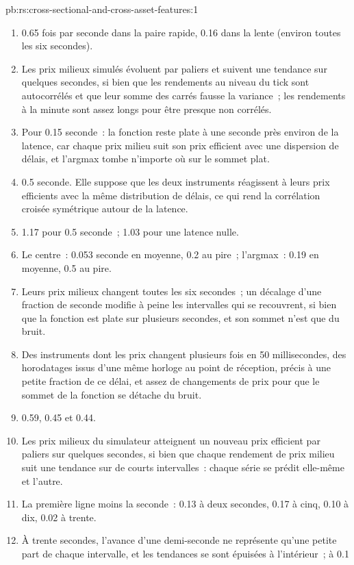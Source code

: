 \begin{solution}{pb:rs:cross-sectional-and-cross-asset-features:1}
\begin{enumerate}
\item 0.65 fois par seconde dans la paire rapide, 0.16 dans la lente (environ toutes les six secondes).
\item Les prix milieux simulés évoluent par paliers et suivent une tendance sur quelques secondes, si bien que les rendements au niveau du tick sont autocorrélés et que leur somme des carrés
fausse la variance~; les rendements à la minute sont assez longs pour être presque non corrélés.
\item Pour 0.15 seconde~: la fonction reste plate à une seconde près environ de la latence, car chaque prix milieu suit son prix efficient avec une
dispersion de délais, et l'argmax tombe n'importe où sur le sommet plat.
\item 0.5 seconde. Elle suppose que les deux instruments réagissent à leurs prix efficients avec la même distribution de délais, ce qui rend la
corrélation croisée symétrique autour de la latence.
\item 1.17 pour 0.5 seconde~; 1.03 pour une latence nulle.
\item Le centre~: 0.053 seconde en moyenne, 0.2 au pire~; l'argmax~: 0.19 en moyenne, 0.5 au pire.
\item Leurs prix milieux changent toutes les six secondes~; un décalage d'une fraction de seconde modifie à peine les intervalles qui se recouvrent, si bien que la fonction est
plate sur plusieurs secondes, et son sommet n'est que du bruit.
\item Des instruments dont les prix changent plusieurs fois en 50 millisecondes, des horodatages issus d'une même horloge au point de réception, précis à une
petite fraction de ce délai, et assez de changements de prix pour que le sommet de la fonction se détache du bruit.
\item 0.59, 0.45 et 0.44.
\item Les prix milieux du simulateur atteignent un nouveau prix efficient par paliers sur quelques secondes, si bien que chaque rendement de prix milieu suit une tendance sur de courts intervalles~:
chaque série se prédit elle-même et l'autre.
\item La première ligne moins la seconde~: 0.13 à deux secondes, 0.17 à cinq, 0.10 à dix, 0.02 à trente.
\item À trente secondes, l'avance d'une demi-seconde ne représente qu'une petite part de chaque intervalle, et les tendances se sont épuisées à l'intérieur~; à 0.1

\end{enumerate}
\end{solution}
